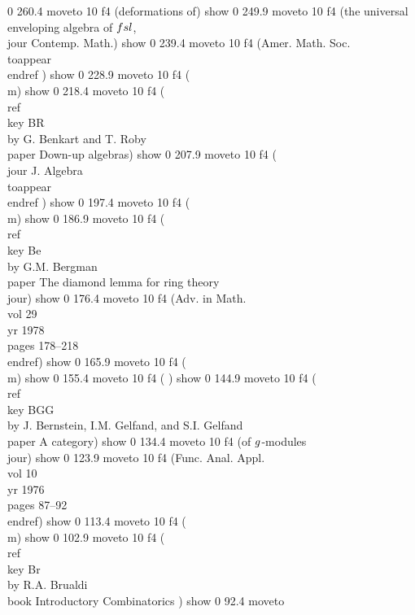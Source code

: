 0 260.4 moveto
10 f4
(deformations of) show
0 249.9 moveto
10 f4
(the universal enveloping algebra of $\\fsl$, \\jour Contemp. Math.) show
0 239.4 moveto
10 f4
(Amer. Math. Soc. \\toappear \\endref  ) show
0 228.9 moveto
10 f4
(\\m) show
0 218.4 moveto
10 f4
(\\ref \\key BR \\by G. Benkart and T. Roby \\paper Down-up algebras) show
0 207.9 moveto
10 f4
(\\jour J. Algebra \\toappear \\endref ) show
0 197.4 moveto
10 f4
(\\m) show
0 186.9 moveto
10 f4
(\\ref\\key Be \\by G.M. Bergman \\paper The diamond lemma for ring theory \\jour) show
0 176.4 moveto
10 f4
(Adv. in Math. \\vol 29 \\yr 1978 \\pages 178--218\\endref) show
0 165.9 moveto
10 f4
(\\m) show
0 155.4 moveto
10 f4
( ) show
0 144.9 moveto
10 f4
(\\ref\\key BGG\\by J. Bernstein, I.M. Gelfand, and S.I. Gelfand \\paper A category) show
0 134.4 moveto
10 f4
(of $\\g$-modules \\jour) show
0 123.9 moveto
10 f4
(Func. Anal. Appl. \\vol 10 \\yr 1976 \\pages 87--92\\endref) show
0 113.4 moveto
10 f4
(\\m) show
0 102.9 moveto
10 f4
(\\ref \\key Br \\by R.A. Brualdi \\book Introductory Combinatorics   ) show
0 92.4 moveto
